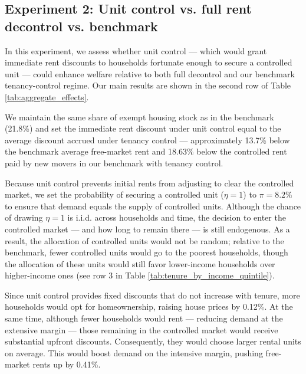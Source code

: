 \documentclass[parskip=full]{article}
\begin{document}
\subsection{Experiment 2: Unit control vs. full rent decontrol vs. benchmark}\label{sec:exp_2}

In this experiment, we assess whether unit control — which would grant immediate rent discounts to households fortunate enough to secure a controlled unit — could enhance welfare relative to both full decontrol and our benchmark tenancy-control regime. Our main results are shown in the second row of Table \ref{tab:aggregate_effects}.

We maintain the same share of exempt housing stock as in the benchmark (21.8\%) and set the immediate rent discount under unit control equal to the average discount accrued under tenancy control — approximately 13.7\% below the benchmark average free-market rent and 18.63\% below the controlled rent paid by new movers in our benchmark with tenancy control.

Because unit control prevents initial rents from adjusting to clear the controlled market, we set the probability of securing a controlled unit ($\eta=1$) to $\pi=8.2\%$ to ensure that demand equals the supply of controlled units. Although the chance of drawing $\eta=1$ is i.i.d. across households and time, the decision to enter the controlled market — and how long to remain there — is still endogenous. As a result, the allocation of controlled units would not be random; relative to the benchmark, fewer controlled units would go to the poorest households, though the allocation of these units would still favor lower-income households over higher-income ones (see row 3 in Table \ref{tab:tenure_by_income_quintile}).

Since unit control provides fixed discounts that do not increase with tenure, more households would opt for homeownership, raising house prices by 0.12\%. At the same time, although fewer households would rent — reducing demand at the extensive margin — those remaining in the controlled market would receive substantial upfront discounts. Consequently, they would choose larger rental units on average. This would boost demand on the intensive margin, pushing free-market rents up by 0.41\%.
\end{document}

